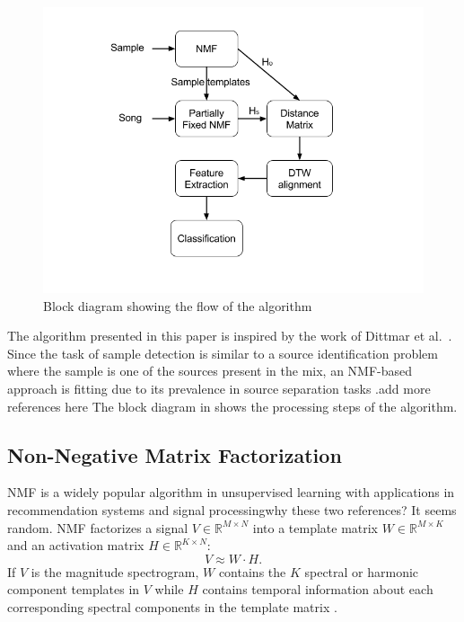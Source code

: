 \documentclass{article}
\begin{document}
\begin{figure}[!ht]
\centering
\includegraphics[width=\linewidth]{block_diagram.png}
\caption{Block diagram showing the flow of the algorithm}
\label{fig_block}
\end{figure}

The algorithm presented in this paper is inspired by the work of Dittmar et al.~\cite{dittmar2012audio}. Since the task of sample detection is similar to a source identification problem where the sample is one of the sources present in the mix, an NMF-based approach is fitting due to its prevalence in source separation tasks \cite{virtanen2007monaural}.{\color{red}add more references here} The block diagram in  shows the processing steps of the algorithm.

\subsection{Non-Negative Matrix Factorization}
NMF is a widely popular algorithm in unsupervised learning with applications in recommendation systems\cite{koren2009matrix} and signal processing\cite{lee1999learning}{\color{red}why these two references? It seems random}. NMF factorizes a signal $V \in \mathbb{R}^{M\times N}$ into a template matrix $W \in \mathbb{R}^{M\times K}$ and an activation matrix $H \in \mathbb{R}^{K\times N}$:
\[ V \approx W\cdot H.\]
If $V$ is the magnitude spectrogram, $W$ contains the $K$ spectral or harmonic component templates in $V$ while $H$ contains temporal information about each corresponding spectral components in the template matrix \cite{smaragdis2003non}.
\end{document}
